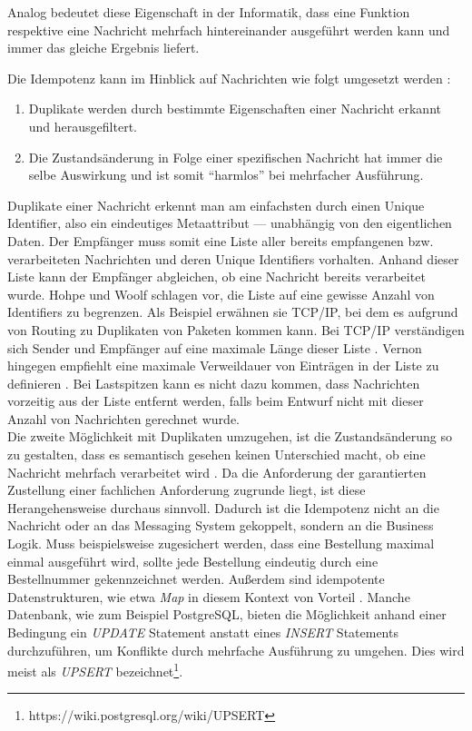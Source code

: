 Analog bedeutet diese Eigenschaft in der Informatik, dass eine Funktion respektive eine Nachricht mehrfach hintereinander ausgeführt werden kann und immer das gleiche Ergebnis liefert.\\

\pagebreak

Die Idempotenz kann im Hinblick auf Nachrichten wie folgt umgesetzt werden \cite[S.~383]{vernon_reactive_2016} \cite[S.~529]{hohpe_enterprise_2004}:

\begin{enumerate}
\item Duplikate werden durch bestimmte Eigenschaften einer Nachricht erkannt und herausgefiltert.
\item Die Zustandsänderung in Folge einer spezifischen Nachricht hat immer die selbe Auswirkung und ist somit \enquote{harmlos} bei mehrfacher Ausführung.
\end{enumerate}

Duplikate einer Nachricht erkennt man am einfachsten durch einen Unique Identifier, also ein eindeutiges Metaattribut --- unabhängig von den eigentlichen Daten. Der Empfänger muss somit eine Liste aller bereits empfangenen bzw. verarbeiteten Nachrichten und deren Unique Identifiers vorhalten. Anhand dieser Liste kann der Empfänger abgleichen, ob eine Nachricht bereits verarbeitet wurde. Hohpe und Woolf schlagen vor, die Liste auf eine gewisse Anzahl von Identifiers zu begrenzen. Als Beispiel erwähnen sie TCP/IP, bei dem es aufgrund von Routing zu Duplikaten von Paketen kommen kann. Bei TCP/IP verständigen sich Sender und Empfänger auf eine maximale Länge dieser Liste \cite[S.~530]{hohpe_enterprise_2004}. Vernon hingegen empfiehlt eine maximale Verweildauer von Einträgen in der Liste zu definieren \cite[S.~383]{vernon_reactive_2016}. Bei Lastspitzen kann es nicht dazu kommen, dass Nachrichten vorzeitig aus der Liste entfernt werden, falls beim Entwurf nicht mit dieser Anzahl von Nachrichten gerechnet wurde.\\

Die zweite Möglichkeit mit Duplikaten umzugehen, ist die Zustandsänderung so zu gestalten, dass es semantisch gesehen keinen Unterschied macht, ob eine Nachricht mehrfach verarbeitet wird \cite[S.~530]{hohpe_enterprise_2004}. Da die Anforderung der garantierten Zustellung einer fachlichen Anforderung zugrunde liegt, ist diese Herangehensweise durchaus sinnvoll. Dadurch ist die Idempotenz nicht an die Nachricht oder an das Messaging System gekoppelt, sondern an die Business Logik. Muss beispielsweise zugesichert werden, dass eine Bestellung maximal einmal ausgeführt wird, sollte jede Bestellung eindeutig durch eine Bestellnummer gekennzeichnet werden. Außerdem sind idempotente Datenstrukturen, wie etwa \textit{Map} in diesem Kontext von Vorteil \cite[S.~386]{vernon_reactive_2016}. Manche Datenbank, wie zum Beispiel PostgreSQL, bieten die Möglichkeit anhand einer Bedingung ein \textit{UPDATE} Statement anstatt eines \textit{INSERT} Statements durchzuführen, um Konflikte durch mehrfache Ausführung zu umgehen. Dies wird meist als \textit{UPSERT} bezeichnet\footnote{https://wiki.postgresql.org/wiki/UPSERT}.\\

